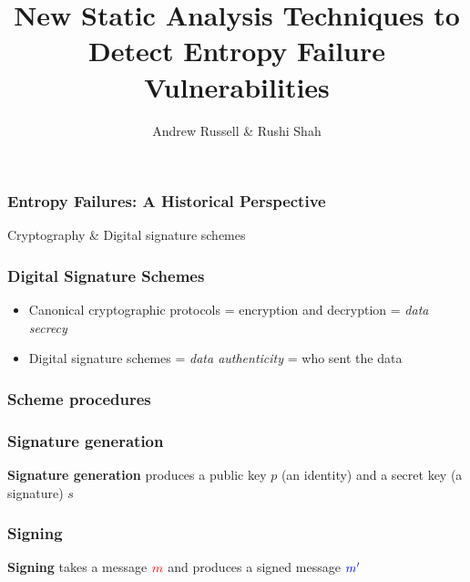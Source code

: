 \documentclass{beamer} %
\title{New Static Analysis Techniques to Detect Entropy Failure Vulnerabilities}
\author{Andrew Russell \& Rushi Shah}
\institute{The University of Texas at Austin}
\theoremstyle{definition} %
\begin{document}
\begin{frame}
\titlepage
\end{frame}

\begin{frame}
\frametitle{Entropy Failures: A Historical Perspective}

\begin{center}
\Large{Cryptography \& Digital signature schemes}

\end{center}

\end{frame}

\begin{frame}

\frametitle{Digital Signature Schemes}

\begin{itemize}
\item Canonical cryptographic protocols = encryption and decryption = \emph{data secrecy}
\pause
\item Digital signature schemes = \emph{data authenticity} = who sent the data
\end{itemize}

\begin{center}


\end{center}
\end{frame}

\begin{frame}

\frametitle{Scheme procedures}

\begin{center}
\end{center}


\end{frame}

\begin{frame}

\frametitle{Signature generation}

\textbf{Signature generation} produces a public key $p$ (an identity) and a secret key (a signature) $s$

\begin{center}
\end{center}

\end{frame}

\begin{frame}

\frametitle{Signing}

\textbf{Signing} takes a message $\textcolor{red}{m}$ and produces a signed message $\textcolor{blue}{m'}$

\begin{center}
\end{center}

\end{frame}
\end{document}
